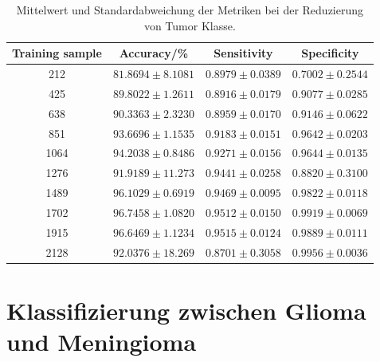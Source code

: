 \begin{table}[H]
    \centering
        \begin{tabular}{cccc}
            \toprule
            Training sample & Accuracy/\% & Sensitivity & Specificity\\
            \midrule
            212  & $81.8694 \pm 8.1081$ & $0.8979 \pm 0.0389$ & $0.7002 \pm 0.2544$\\
            425  & $89.8022 \pm 1.2611$ & $0.8916 \pm 0.0179$ & $0.9077 \pm 0.0285$\\
            638  & $90.3363 \pm 2.3230$ & $0.8959 \pm 0.0170$ & $0.9146 \pm 0.0622$\\
            851  & $93.6696 \pm 1.1535$ & $0.9183 \pm 0.0151$ & $0.9642 \pm 0.0203$\\
            1064 & $94.2038 \pm 0.8486$ & $0.9271 \pm 0.0156$ & $0.9644 \pm 0.0135$\\
            1276 & $91.9189 \pm 11.273$ & $0.9441 \pm 0.0258$ & $0.8820 \pm 0.3100$\\
            1489 & $96.1029 \pm 0.6919$ & $0.9469 \pm 0.0095$ & $0.9822 \pm 0.0118$\\
            1702 & $96.7458 \pm 1.0820$ & $0.9512 \pm 0.0150$ & $0.9919 \pm 0.0069$\\
            1915 & $96.6469 \pm 1.1234$ & $0.9515 \pm 0.0124$ & $0.9889 \pm 0.0111$\\
            2128 & $92.0376 \pm 18.269$ & $0.8701 \pm 0.3058$ & $0.9956 \pm 0.0036$\\
            \bottomrule
        \end{tabular}
  \caption{Mittelwert und Standardabweichung der Metriken bei der Reduzierung von Tumor Klasse.}
  \label{tab:red_tu}
\end{table}

\section{Klassifizierung zwischen Glioma und Meningioma}

